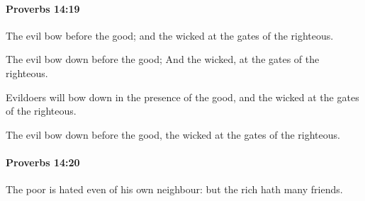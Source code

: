 		\paragraph{Proverbs 14:19} %
			\label{PROVERBS-14-19}

			The evil bow before the good; and the wicked at the gates of the righteous.

			\begin{versebox}
					\item[BHS] 
					\item[ASV] The evil bow down before the good; And the wicked, at the gates of the righteous.
					\item[NIV] Evildoers will bow down in the presence of the good, and the wicked at the gates of the righteous.
					\item[NRSV] The evil bow down before the good, the wicked at the gates of the righteous.
			\end{versebox}

		\paragraph{Proverbs 14:20} %
			\label{PROVERBS-14-20}

			The poor is hated even of his own neighbour: but the rich hath many friends.

